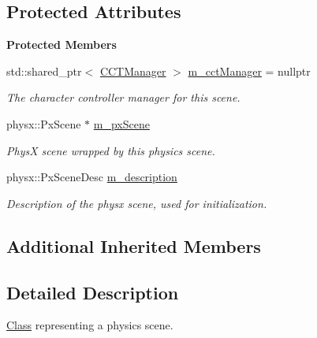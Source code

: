 \subsection*{Protected Attributes}
\begin{Indent}\textbf{ Protected Members}\par
\begin{DoxyCompactItemize}
\item 
\mbox{\label{classrev_1_1_physics_scene_af56ce7f9509731e72f114af2d35f0350}} 
std\+::shared\+\_\+ptr$<$ \mbox{\hyperlink{classrev_1_1_c_c_t_manager}{C\+C\+T\+Manager}} $>$ \mbox{\hyperlink{classrev_1_1_physics_scene_af56ce7f9509731e72f114af2d35f0350}{m\+\_\+cct\+Manager}} = nullptr
\begin{DoxyCompactList}\small\item\em The character controller manager for this scene. \end{DoxyCompactList}\item 
\mbox{\label{classrev_1_1_physics_scene_aedad70bf0da88420d5ced3102e4c9025}} 
physx\+::\+Px\+Scene $\ast$ \mbox{\hyperlink{classrev_1_1_physics_scene_aedad70bf0da88420d5ced3102e4c9025}{m\+\_\+px\+Scene}}
\begin{DoxyCompactList}\small\item\em PhysX scene wrapped by this physics scene. \end{DoxyCompactList}\item 
\mbox{\label{classrev_1_1_physics_scene_aa49475a30b1bd8e1590789e67d4739fb}} 
physx\+::\+Px\+Scene\+Desc \mbox{\hyperlink{classrev_1_1_physics_scene_aa49475a30b1bd8e1590789e67d4739fb}{m\+\_\+description}}
\begin{DoxyCompactList}\small\item\em Description of the physx scene, used for initialization. \end{DoxyCompactList}\end{DoxyCompactItemize}
\end{Indent}
\subsection*{Additional Inherited Members}


\subsection{Detailed Description}
\mbox{\hyperlink{struct_class}{Class}} representing a physics scene. 

